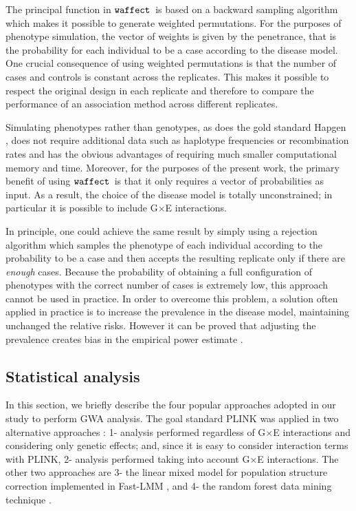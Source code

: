 \documentclass[10pt,a4paper]{article}
\newcommand{\waffect}{${\tt waffect}$\ }
\begin{document}
The principal function in \waffect is based on a backward sampling algorithm which makes it possible to generate weighted permutations. For the purposes of phenotype simulation, the vector of weights is given by the penetrance, that is the probability for each individual to be a case according to the disease model. One crucial consequence of using weighted permutations is that the number of cases and controls is constant across the replicates. This makes it possible to respect the original design in each replicate and therefore to compare the performance of an association method across different replicates. 

Simulating phenotypes rather than genotypes, as does the gold standard Hapgen \citep{su2011hapgen2}, does not require additional data such as haplotype frequencies or recombination rates and has the obvious advantages of requiring much smaller computational memory and time. Moreover, for the purposes of the present work, the primary benefit of using \waffect is that it only requires a vector of probabilities as input. As a result, the choice of the disease model is totally unconstrained; in particular it is possible to include G$\times$E interactions. 

In principle, one could achieve the same result by simply using a rejection algorithm which samples the phenotype of each individual according to the probability to be a case and then accepts the resulting replicate only if there are \emph{enough} cases. Because the probability of obtaining a full configuration of phenotypes with the correct number of cases is  extremely low, this approach cannot be used in practice. In order to overcome this problem, a solution often applied in practice is to increase the prevalence in the disease model, maintaining unchanged the relative risks. However it can be proved that adjusting the prevalence creates bias in the empirical power estimate \citep{perduca2012alternative}.   


\subsection{Statistical analysis}

In this section, we briefly describe the four popular approaches adopted in our study to perform GWA analysis. The goal standard PLINK \citep[individual SNP logistic regression,][]{purcell2007plink} was applied in two alternative approaches :  1- analysis performed regardless of G$\times$E interactions and considering only genetic effects; and, since it is easy to consider interaction terms with PLINK, 2- analysis performed taking into account G$\times$E interactions. The other two approaches are 3- the linear mixed model for population structure correction implemented in Fast-LMM \citep{lippert2011fast}, and 4- the random forest  data mining technique \citep[RandomForest R package,][]{liaw2002rf}.
\end{document}
